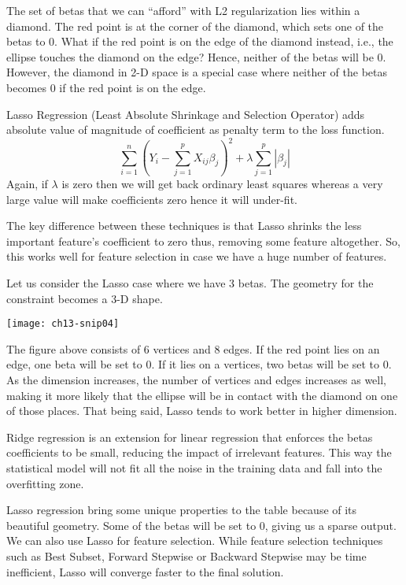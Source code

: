 The set of betas that we can  ``afford'' with L2 regularization lies within a diamond. The red point is at the corner of the diamond, which sets one of the betas to 0.
What if the red point is on the edge of the diamond instead, i.e., the ellipse touches the diamond on the edge? Hence, neither of the betas will be 0. However, the diamond in 2-D space is a special case where neither of the betas becomes 0 if the red point is on the edge.

Lasso Regression (Least Absolute Shrinkage and Selection Operator) adds absolute value of magnitude of coefficient as penalty term to the loss function.
\begin{equation}
\sum_{i=1}^{n}\left(Y_{i}-\sum_{j=1}^{p} X_{i j} \beta_{j}\right)^{2}+\lambda \sum_{j=1}^{p}\left|\beta_{j}\right|
\end{equation}
Again, if $\lambda$ is zero then we will get back ordinary least squares whereas a very large value will make coefficients zero hence it will under-fit.

The key difference between these techniques is that Lasso shrinks the less important feature's coefficient to zero thus, removing some feature altogether. So, this works well for feature selection in case we have a huge number of features.


Let us consider the Lasso case where we have 3 betas. The geometry for the constraint becomes a 3-D shape.
\begin{marginfigure}
\texttt{[image: ch13-snip04]}
\end{marginfigure}

The figure above consists of 6 vertices and 8 edges. If the red point lies on an edge, one beta will be set to 0. If it lies on a vertices, two betas will be set to 0. As the dimension increases, the number of vertices and edges increases as well, making it more likely that the ellipse will be in contact with the diamond on one of those places. That being said, Lasso tends to work better in higher dimension.


Ridge regression is an extension for linear regression that enforces the betas coefficients to be small, reducing the impact of irrelevant features. This way the statistical model will not fit all the noise in the training data and fall into the overfitting zone.

Lasso regression bring some unique properties to the table because of its beautiful geometry. Some of the betas will be set to 0, giving us a sparse output. We can also use Lasso for feature selection. While feature selection techniques such as Best Subset, Forward Stepwise or Backward Stepwise may be time inefficient, Lasso will converge faster to the final solution.

